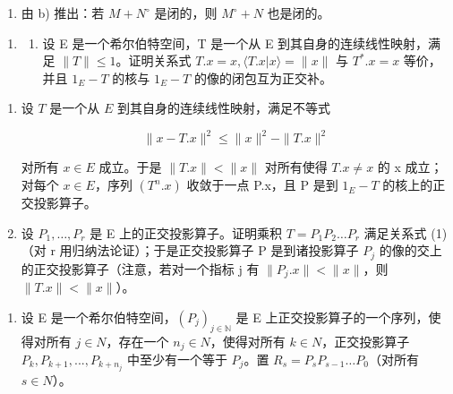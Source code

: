 \begin{enumerate}
\def\labelenumi{\alph{enumi})}
\setcounter{enumi}{2}
\tightlist
\item
  由 b) 推出：若 \(M + N^{\circ}\) 是闭的，则 \(M^{\circ} + N\) 也是闭的。
\end{enumerate}

\begin{enumerate}
\def\labelenumi{\arabic{enumi})}
\setcounter{enumi}{7}
\tightlist
\item
  \begin{enumerate}
  \def\labelenumii{\alph{enumii})}
  \tightlist
  \item
    设 E 是一个希尔伯特空间，T 是一个从 E 到其自身的连续线性映射，满足 \(\|T\|\leqslant1\)。证明关系式 \(T.x=x,\langle T.x|x\rangle=\|x\|\) 与 \(T^{*}.x=x\) 等价，并且 \(1_{E}-T\) 的核与 \(1_{E}-T\) 的像的闭包互为正交补。
  \end{enumerate}
\end{enumerate}

\begin{enumerate}
\def\labelenumi{\alph{enumi})}
\setcounter{enumi}{1}
\tightlist
\item
  设 \(T\) 是一个从 \(E\) 到其自身的连续线性映射，满足不等式

\[
\| x - T. x \| ^ {2} \leqslant \| x \| ^ {2} - \| T. x \| ^ {2}\tag{1}
\]

对所有 \(x \in E\) 成立。于是 \(\|T.x\| < \|x\|\) 对所有使得 \(T.x \neq x\) 的 x 成立；对每个 \(x \in E\)，序列 \((T^{n}.x)\) 收敛于一点 P.x，且 P 是到 \(1_{E} - T\) 的核上的正交投影算子。
\item
  设 \(P_{1}, \ldots, P_{r}\) 是 E 上的正交投影算子。证明乘积 \(T = P_{1}P_{2} \ldots P_{r}\) 满足关系式 (1)（对 r 用归纳法论证）；于是正交投影算子 P 是到诸投影算子 \(P_{j}\) 的像的交上的正交投影算子（注意，若对一个指标 j 有 \(\|P_{j}.x\| < \|x\|\)，则 \(\|T.x\| < \|x\|\)）。
\end{enumerate}

\begin{enumerate}
\def\labelenumi{\arabic{enumi})}
\setcounter{enumi}{8}
\tightlist
\item
  设 E 是一个希尔伯特空间，\((P_{j})_{j\in\mathbb{N}}\) 是 E 上正交投影算子的一个序列，使得对所有 \(j\in N\)，存在一个 \(n_{j}\in N\)，使得对所有 \(k\in N\)，正交投影算子 \(P_{k}, P_{k+1}, ..., P_{k+n_{j}}\) 中至少有一个等于 \(P_{j}\)。置 \(R_{s}=P_{s}P_{s-1}\ldots P_{0}\)（对所有 \(s\in N\)）。
\end{enumerate}

